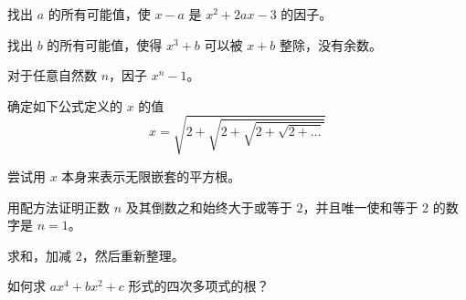 \begin{problem}
    找出 $a$ 的所有可能值，使 $x-a$ 是 $x^2+2ax-3$ 的因子。
\end{problem}
\begin{problem}
    找出 $b$ 的所有可能值，使得 $x^3 + b$ 可以被 $x + b$ 整除，没有余数。
\end{problem}
\begin{problem}
    对于任意自然数 $n$，因子 $x^n - 1$。
\end{problem}
\begin{problem}
    确定如下公式定义的 $x$ 的值
    \[x = \sqrt{2+\sqrt{2+\sqrt{2+\sqrt{2+\dots}}}}\]
    \begin{hint}
        尝试用 $x$ 本身来表示无限嵌套的平方根。
    \end{hint}
\end{problem}
\begin{problem}
    用配方法证明正数 $n$ 及其倒数之和始终大于或等于 $2$，并且唯一使和等于 $2$ 的数字是 $n = 1$。
    \begin{hint}
        求和，加减 $2$，然后重新整理。
    \end{hint}
\end{problem}
\begin{problem}
    如何求 $ax^4 + bx^2 + c$ 形式的四次多项式的根？
\end{problem}